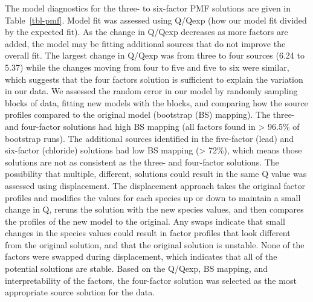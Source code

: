 \documentclass[
  letterpaper,
  DIV=11,
  numbers=noendperiod]{scrartcl}
\begin{document}
The model diagnostics for the three- to six-factor PMF solutions are
given in Table~\ref{tbl-pmf}. Model fit was assessed using Q/Qexp (how
our model fit divided by the expected fit). As the change in Q/Qexp
decreases as more factors are added, the model may be fitting additional
sources that do not improve the overall fit. The largest change in
Q/Qexp was from three to four sources (6.24 to 5.37) while the changes
moving from four to five and five to six were similar, which suggests
that the four factors solution is sufficient to explain the variation in
our data. We assessed the random error in our model by randomly sampling
blocks of data, fitting new models with the blocks, and comparing how
the source profiles compared to the original model (bootstrap (BS)
mapping). The three- and four-factor solutions had high BS mapping (all
factors found in \textgreater{} 96.5\% of bootstrap runs). The
additional sources identified in the five-factor (lead) and six-factor
(chloride) solutions had low BS mapping (\textgreater{} 72\%), which
means those solutions are not as consistent as the three- and
four-factor solutions. The possibility that multiple, different,
solutions could result in the same Q value was assessed using
displacement. The displacement approach takes the original factor
profiles and modifies the values for each species up or down to maintain
a small change in Q, reruns the solution with the new species values,
and then compares the profiles of the new model to the original. Any
swaps indicate that small changes in the species values could result in
factor profiles that look different from the original solution, and that
the original solution is unstable. None of the factors were swapped
during displacement, which indicates that all of the potential solutions
are stable. Based on the Q/Qexp, BS mapping, and interpretability of the
factors, the four-factor solution was selected as the most appropriate
source solution for the data.
\end{document}
